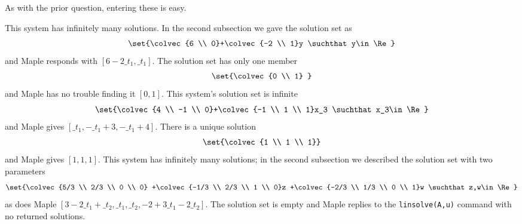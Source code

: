 \begin{ans}{3}
      As with the prior question, entering these is easy.
      \begin{exparts}
        \partsitem This system has infinitely many solutions.
              In the second subsection we gave the solution set as
              \begin{equation*}
              \set{\colvec{6 \\ 0}+\colvec{-2 \\ 1}y
                      \suchthat y\in\Re}
              \end{equation*}
              and Maple responds with $[6-2\_t_1,\_t_1]$.
        \partsitem The solution set has only one member
          \begin{equation*}
             \set{\colvec{0 \\ 1} }
          \end{equation*}
          and Maple has no trouble finding it $[0,1]$.
        \partsitem This system's solution set is infinite
          \begin{equation*}
            \set{\colvec{4 \\ -1 \\ 0}+\colvec{-1 \\ 1 \\ 1}x_3
                             \suchthat x_3\in\Re}
          \end{equation*}
          and Maple gives $[\_t_1,-\_t_1+3,-\_t_1+4]$.
        \partsitem There is a unique solution
           \begin{equation*}
             \set{\colvec{1 \\ 1 \\ 1}}
           \end{equation*}
           and Maple gives $[1,1,1]$.
        \partsitem This system has infinitely many solutions; in the
           second subsection we described the solution set with
           two parameters
           \begin{equation*}
             \set{\colvec{5/3 \\ 2/3 \\ 0 \\ 0}
                  +\colvec{-1/3 \\ 2/3 \\ 1 \\ 0}z
                  +\colvec{-2/3 \\ 1/3 \\ 0 \\ 1}w
                  \suchthat z,w\in\Re}
           \end{equation*}
           as does Maple $[3-2\_t_1+\_t_2,\_t_1,\_t_2,-2+3\_t_1-2\_t_2]$.
        \partsitem The solution set is empty and Maple replies to the
           \texttt{linsolve(A,u)} command with no returned solutions.
      \end{exparts}
    
\end{ans}
